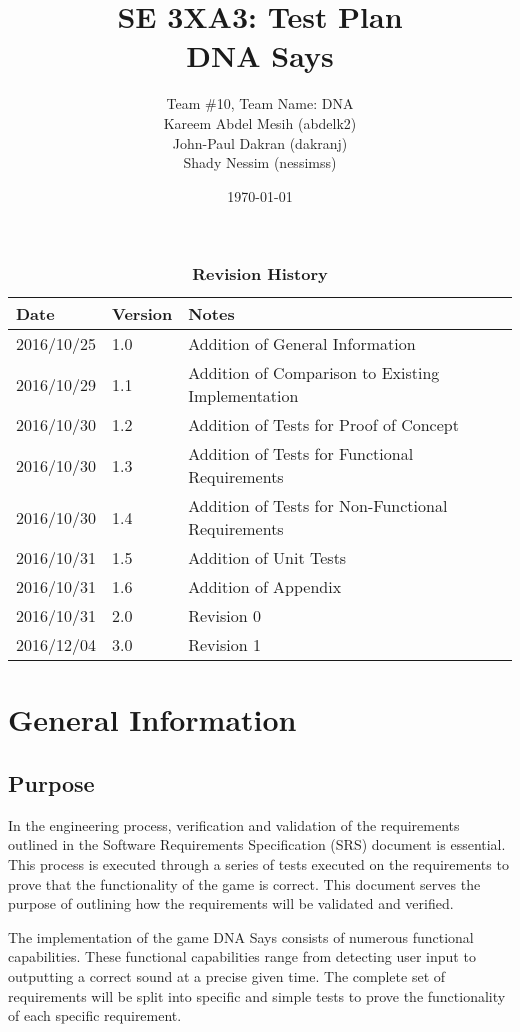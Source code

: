 \documentclass[12pt, titlepage]{article}
\title{SE 3XA3: Test Plan\\DNA Says}
\author{Team \#10, Team Name: DNA
		\\ Kareem Abdel Mesih (abdelk2)
		\\ John-Paul Dakran (dakranj)
		\\ Shady Nessim (nessimss)
}
\date{\today}
\begin{document}
\maketitle
{}
\tableofcontents
\listoftables

\begin{table}[h]
\caption{\bf Revision History}
\begin{tabularx}{\textwidth}{p{3cm}p{2cm}X}
\toprule {\bf Date} & {\bf Version} & {\bf Notes}\\
\midrule
2016/10/25 & 1.0 & Addition of General Information \\
2016/10/29 & 1.1 & Addition of Comparison to Existing Implementation\\
2016/10/30 & 1.2 & Addition of Tests for Proof of Concept\\
2016/10/30 & 1.3 & Addition of Tests for Functional Requirements\\
2016/10/30 & 1.4 & Addition of Tests for Non-Functional Requirements\\
2016/10/31 & 1.5 & Addition of Unit Tests\\
2016/10/31 & 1.6 & Addition of Appendix\\
2016/10/31 & 2.0 & Revision 0\\
2016/12/04 & 3.0 & Revision 1\\
\bottomrule
\end{tabularx}
\end{table}
\newpage
{}
\section{General Information}
\subsection{Purpose}

\par In the engineering process, verification and validation of the requirements outlined in the Software Requirements Specification (SRS) document is essential. This process is executed through a series of tests executed on the requirements to prove that the functionality of the game is correct. This document serves the purpose of outlining how the requirements will be validated and verified.
\\
\par The implementation of the game DNA Says consists of numerous functional capabilities. These functional capabilities range from detecting user input to outputting a correct sound at a precise given time. The complete set of requirements will be split into specific and simple tests to prove the functionality of each specific requirement. 
\end{document}
